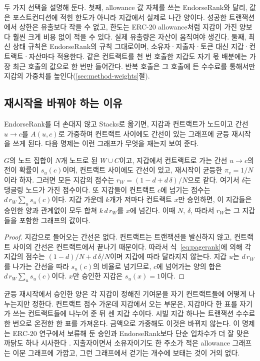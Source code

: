 두 가지 선택을 설명해 둔다. 첫째, allowance 값 자체를 쓰는 EndorseRank와 달리, 값은 포스트컨디션에 적힌 한도가 아니라 지갑에서 실제로 나간 양이다. 성공한 트랜잭션에서 상한은 유출보다 작을 수 없고, 한도는 ERC-20 allowance처럼 지갑이 가진 양보다 훨씬 크게 비용 없이 적을 수 있다. 실제 유출량은 자산이 움직여야 생긴다. 둘째, 최신 상태 규칙은 EndorseRank의 규칙 그대로이며, 소유자·지출자·토큰 대신 지갑·컨트랙트·자산마다 적용한다. 같은 컨트랙트를 천 번 호출한 지갑도 자기 몫 배분에는 가장 최근 호출의 값으로 한 번만 들어간다. 반복 호출은 그 호출에 든 수수료를 통해서만 지갑의 가중치를 높인다(\ref{sec:method-weights}절).

\subsection{재시작을 바꿔야 하는 이유}

EndorseRank를 더 손대지 않고 Stacks로 옮기면, 지갑과 컨트랙트가 노드이고 간선 $u\to c$를 $A(u,c)$로 가중하며 컨트랙트 사이에도 간선이 있는 그래프에 균등 재시작을 쓰게 된다. 다음 명제는 이런 그래프가 무엇을 재는지 보여 준다.

\begin{proposition}[균등 재시작은 지갑 수를 센다]
\label{prop:bipartite}
$G$의 노드 집합이 $N$개 노드로 된 $W\cup C$이고, 지갑에서 컨트랙트로 가는 간선 $u\to c$의 전이 확률이 $s_u(c)$이며, 컨트랙트 사이에도 간선이 있고, 재시작이 균등한 $\pi_v=1/N$이라 하자. 그러면 모든 지갑의 점수는 $r_W=(1-d+d\,\delta)/N$으로 같다. 여기서 $\delta$는 댕글링 노드가 가진 점수이다. 또 지갑들이 컨트랙트 $c$에 넘기는 점수는 $d\,r_W\sum_{u}s_u(c)$이다. 지갑 가운데 $k$개가 저마다 컨트랙트 $x$만 승인하면, 이 지갑들은 승인한 양과 관계없이 모두 합쳐 $k\,d\,r_W$를 $x$에 넘긴다. 이때 $N$, $\delta$, 따라서 $r_W$는 그 지갑들을 포함한 그래프의 값이다.
\end{proposition}

\begin{proof}
지갑으로 들어오는 간선은 없다. 컨트랙트는 트랜잭션을 발신하지 않고, 컨트랙트 사이의 간선은 컨트랙트에서 끝나기 때문이다. 따라서 식~\eqref{eq:pagerank}에 의해 각 지갑의 점수는 $(1-d)/N+d\,\delta/N$이며 지갑에 따라 달라지지 않는다. 지갑 $u$는 $d\,r_W$를 나가는 간선을 따라 $s_u(c)$의 비율로 넘기므로, $c$에 넘어가는 양의 합은 $d\,r_W\sum_u s_u(c)$이다. $x$만 승인한 지갑은 $s_u(x)=1$이다.
\end{proof}

균등 재시작에서 승인한 양은 각 지갑이 정해진 기여분을 자기 컨트랙트들에 어떻게 나누는지만 정한다. 컨트랙트 점수 가운데 지갑에서 오는 부분은, 지갑마다 한 표를 자기가 쓰는 컨트랙트들에 나누어 준 뒤 센 지갑 수이다. 시빌 지갑 하나는 트랜잭션 수수료 한 번으로 온전한 한 표를 가져온다. 금액으로 가중해도 이것은 바뀌지 않는다. 이 명제는 ERC-20 연구에서 보류해 둔 승인과 EndorseRank보다 단순 입차수가 더 잘 맞은 까닭도 하나 시사한다 \cite{kwon2026endorserank}. 지출자이면서 소유자이기도 한 주소가 적은 allowance 그래프는 이분 그래프에 가깝고, 그런 그래프에서 걷기는 개수에 보태는 것이 거의 없다.

